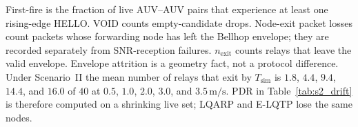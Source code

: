 First-fire is the fraction of live AUV--AUV pairs that experience
at least one rising-edge HELLO.
VOID counts empty-candidate drops.
Node-exit packet losses count packets whose forwarding node has
left the Bellhop envelope; they are recorded separately from
SNR-reception failures.
$n_{\mathrm{exit}}$ counts relays that leave the valid envelope.
Envelope attrition is a geometry fact, not a protocol difference.
Under Scenario~II the mean number of relays that exit by
$T_{\mathrm{sim}}$ is $1.8$, $4.4$, $9.4$, $14.4$, and $16.0$ of
$40$ at $0.5$, $1.0$, $2.0$, $3.0$, and $3.5\,\mathrm{m/s}$.
PDR in Table~\ref{tab:s2_drift} is therefore computed on a
shrinking live set; LQARP and E-LQTP lose the same nodes.
